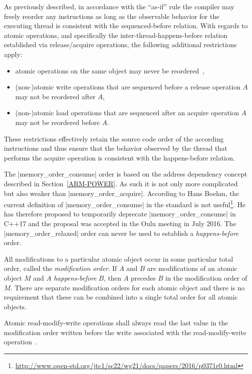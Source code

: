 \documentclass[a4paper,12pt,notitlepage,twoside,openright]{article}
\begin{document}
As previously described, in accordance with the ``as-if'' rule the compiler
may freely reorder any instructions as long as the observable behavior for
the executing thread is consistent with the sequenced-before relation. With
regards to atomic operations, and specifically the inter-thread-happens-before
relation established via release/acquire operations, the following additional
restrictions apply:
\begin{itemize}
  \item atomic operations on the same object may never be
        reordered~\cite[1.10.19, p. 14]{c++11_standard},
  \item (non-)atomic write operations that are sequenced before a release
        operation $A$ may not be reordered after $A$,
  \item (non-)atomic load operations that are sequenced after an acquire
        operation $A$ may not be reordered before $A$.
\end{itemize}
These restrictions effectively retain the source code order of the according
instructions and thus ensure that the behavior observed by the thread that
performs the acquire operation is consistent with the happens-before relation.

The |memory_order_consume| order is based on the address dependency
concept described in Section~\ref{ARM-POWER}. As such it is not only
more complicated but also weaker than |memory_order_acquire|.
According to Hans Boehm, the current definition of
|memory_order_consume| in the standard is not
useful\footnote{\url{http://www.open-std.org/jtc1/sc22/wg21/docs/papers/2016/p0371r0.html}}. He
has therefore proposed to temporarily deprecate |memory_order_consume|
in C++17 and the proposal was accepted in the Oulu meeting in July
2016. The |memory_order_relaxed| order can never be used to establish a
\emph{happens-before} order.

All modifications to a particular atomic object occur in some
particular total order, called the \emph{modification order}. If $A$
and $B$ are modifications of an atomic object $M$ and $A$
\emph{happens-before} $B$, then $A$ precedes $B$ in the modification
order of $M$. There are separate modification orders for each atomic
object and there is no requirement that these can be combined into a
single total order for all atomic objects.

Atomic read-modify-write operations shall always read the last value
in the modification order written before the write associated with the
read-modify-write operation~\cite[29.3.12, p. 1105]{c++11_standard}.
\end{document}
